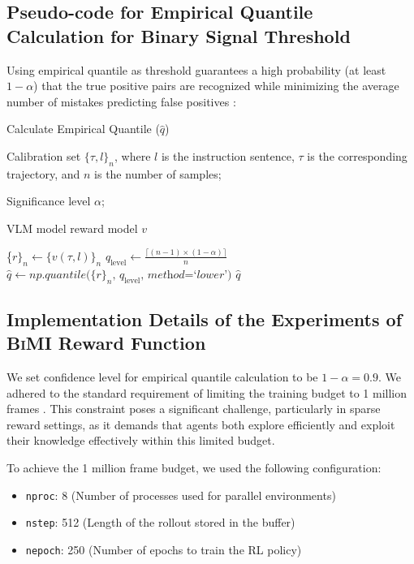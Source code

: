 \documentclass{article}
\theoremstyle{plain}
\theoremstyle{definition}
\theoremstyle{remark}
\begin{document}
\subsection{Pseudo-code for Empirical Quantile Calculation for Binary Signal Threshold}
\label{sec:pseudo-code-for-threshold}

Using empirical quantile as threshold guarantees a high probability (at least $1 - \alpha$) that the true positive pairs are recognized while minimizing the average number of mistakes predicting false positives \citep{sadinle2019least}: 

\begin{algorithm}[H]
    \caption{Calculate Empirical Quantile ($\hat{q}$)}
    \label{app:cpq_algo}
    \begin{algorithmic}[1] %
        \Require Calibration set $\{\tau, l\}_n$, where $l$ is the instruction sentence, $\tau$ is the corresponding trajectory, and $n$ is the number of samples;

        Significance level $\alpha$; 

        VLM model reward model $v$

        \State \{$r\}_n \gets \{v(\tau, l)\}_n$
        \State $q_\text{level} \gets \frac{\lceil (n-1) \times (1-\alpha) \rceil}{n}$
        \State $\hat q \gets \textit{np.quantile($\{r\}_n$, $q_\text{level}$, method=`lower')}$ 
        \State \Return $\hat q$
    \end{algorithmic}
\end{algorithm}


\subsection{Implementation Details of the Experiments of \textsc{BiMI} Reward Function}
\label{sec:experiments_stage_2_details}
We set confidence level for empirical quantile calculation to be $1 - \alpha=0.9$. We adhered to the standard requirement of limiting the training budget to 1 million frames \citep{Hafner2021BenchmarkingTS}. This constraint poses a significant challenge, particularly in sparse reward settings, as it demands that agents both explore efficiently and exploit their knowledge effectively within this limited budget.

To achieve the 1 million frame budget, we used the following configuration: 
\begin{itemize}
    \item \texttt{nproc}: 8 (Number of processes used for parallel environments)
    \item \texttt{nstep}: 512 (Length of the rollout stored in the buffer)
    \item \texttt{nepoch}: 250 (Number of epochs to train the RL policy)
\end{itemize} 
\end{document}
